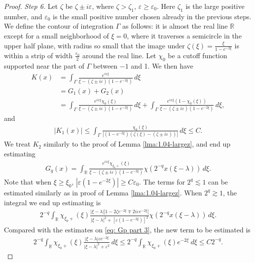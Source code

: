 \documentclass[GreensFunctions.tex]{subfiles}
\begin{document}
\begin{proof}
	{\em Step 6.} 
	Let $\zeta$ be $\zeta\pm i\varepsilon$, where $\zeta>\zeta_1$, 
	$\varepsilon\ge\varepsilon_0$. Here $\zeta_1$ is the large positive number, and 
	$\varepsilon_0$ is the small positive number chosen already in the previous steps. 
	We define the contour of integration $\Gamma$ as follows: it is almost the real line 
	${\mathbb R}$ except for a small neighborhood of $\xi=0$, where it traverses a 
	semicircle in the upper half plane, with radius so small that the image under 
	$\zeta(\xi) = \frac{\xi}{1-e^{-2\xi}}$ is within a strip of width 
	$\frac{\varepsilon_0}2$ around the real line. Let $\chi_0$ be a cutoff function 
	supported near the part of $\Gamma$ between $-1$ and 1. We then have 
	\begin{align*}
		K(x) 
			&= 
				\int_\Gamma 
					\frac{e^{ix\xi}}{\xi-(\zeta\pm i\varepsilon)(1-e^{-2\xi})}
				\,d\xi\\
			&= 
				G_1(x) + G_2(x)
				\\
			&= 
				\int_\Gamma 
					\frac{e^{ix\xi} \chi_0(\xi)}
						{\xi-(\zeta\pm i\varepsilon)(1-e^{-2\xi})}
				\,d\xi
				+
				\int_\Gamma 
					\frac{e^{ix\xi}(1-\chi_0(\xi))}
						{\xi-(\zeta\pm i\varepsilon)(1-e^{-2\xi})}
				\,d\xi,
	\end{align*}
	and
	\begin{align*}
		|K_1(x)|
			\le 
				\int_\Gamma 
					\frac{\chi_0(\xi)}
						{|(1-e^{-2\xi})(\zeta(\xi)-(\zeta\pm i\varepsilon))|}
					\,d\xi
			\le C.
	\end{align*}
	We treat $K_2$ similarly to the proof of Lemma \ref{lma:1.04-largez}, and end up 
	estimating
	\begin{align*}
		G_q(x) 
			= 
				\int_{\mathbb R} 
					\frac{e^{ix\xi}\chi_{\xi_0+}(\xi)}
						{\xi-(\zeta\pm i\varepsilon)(1-e^{-2\xi})}
					\chi(2^{-q}x(\xi-\lambda))
				\,d\xi.	
	\end{align*}
	Note that when $\xi\ge \xi_0$, $|\varepsilon(1-e^{-2\xi})|\ge C\varepsilon_0$. The 
	terms for $2^q\lesssim 1$ can be estimated similarly as in proof of Lemma 
	\ref{lma:1.04-largez}. When $2^q\gtrsim 1$, the integral we end up estimating is 
	\begin{align}
		2^{-q} 
		\int_{\mathbb R} 
			\chi_{\xi_0+}(\xi)
			\frac{|\xi-\lambda||1-2\zeta e^{-2\xi} \mp 2i\varepsilon e^{-2\xi}|}
				{|\xi-\lambda|^2+[\varepsilon(1-e^{-2\xi})]^2}
			\chi(2^{-q}x(\xi-\lambda))
		\,d\xi.
	\end{align}
	Compared with the estimates on \eqref{eq: Gp part 3}, the new term to be estimated is
	\begin{align*}
		2^{-q}
			\int_{\mathbb R} 
				\chi_{\xi_0+}(\xi) 
				\frac{|\xi-\lambda|\varepsilon e^{-2\xi}}
					{|\xi-\lambda|^2+\varepsilon^2}
			\,d\xi
		\le 2^{-q}
			\int_{\mathbb R} \chi_{\xi_0+}(\xi) e^{-2\xi}~d\xi 
		\le C2^{-q}.	
	\end{align*}


\end{proof}
\end{document}
